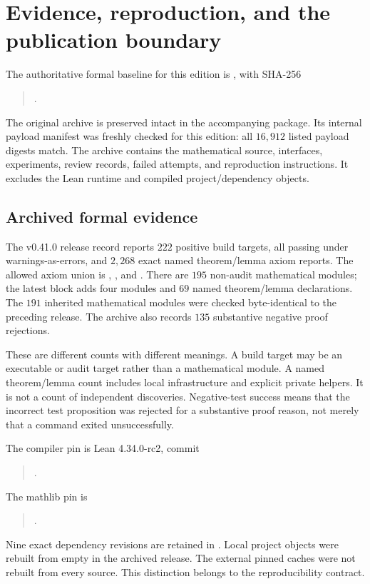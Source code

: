 \section{Evidence, reproduction, and the publication boundary}
\label{sec:publication-evidence}
The authoritative formal baseline for this edition is , with SHA-256
\begin{quote}\small\ttfamily
{}.
\end{quote}
The original archive is preserved intact in the accompanying package. Its internal payload manifest was freshly checked for this edition: all $16{,}912$ listed payload digests match. The archive contains the mathematical source, interfaces, experiments, review records, failed attempts, and reproduction instructions. It excludes the Lean runtime and compiled project/dependency objects.

\subsection{Archived formal evidence}
The v0.41.0 release record reports $222$ positive build targets, all passing under warnings-as-errors, and $2{,}268$ exact named theorem/lemma axiom reports. The allowed axiom union is , , and . There are $195$ non-audit mathematical modules; the latest block adds four modules and $69$ named theorem/lemma declarations. The $191$ inherited mathematical modules were checked byte-identical to the preceding release. The archive also records $135$ substantive negative proof rejections.

These are different counts with different meanings. A build target may be an executable or audit target rather than a mathematical module. A named theorem/lemma count includes local infrastructure and explicit private helpers. It is not a count of independent discoveries. Negative-test success means that the incorrect test proposition was rejected for a substantive proof reason, not merely that a command exited unsuccessfully.

The compiler pin is Lean 4.34.0-rc2, commit
\begin{quote}\small\ttfamily{}.\end{quote}
The mathlib pin is
\begin{quote}\small\ttfamily{}.\end{quote}
Nine exact dependency revisions are retained in . Local project objects were rebuilt from empty in the archived release. The external pinned caches were not rebuilt from every source. This distinction belongs to the reproducibility contract.

